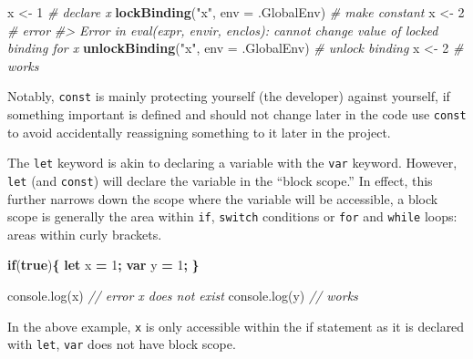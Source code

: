 \documentclass[
]{krantz}
\makeatletter
\newenvironment{Shaded}{\begin{snugshade}}{\end{snugshade}}
\newcommand{\AttributeTok}[1]{\textcolor[rgb]{0.61,0.61,0.61}{#1}}
\newcommand{\CommentTok}[1]{\textcolor[rgb]{0.37,0.37,0.37}{\textit{#1}}}
\newcommand{\ControlFlowTok}[1]{\textcolor[rgb]{0.27,0.27,0.27}{\textbf{#1}}}
\newcommand{\DataTypeTok}[1]{\textcolor[rgb]{0.27,0.27,0.27}{#1}}
\newcommand{\DecValTok}[1]{\textcolor[rgb]{0.06,0.06,0.06}{#1}}
\newcommand{\KeywordTok}[1]{\textcolor[rgb]{0.27,0.27,0.27}{\textbf{#1}}}
\newcommand{\NormalTok}[1]{#1}
\newcommand{\OperatorTok}[1]{\textcolor[rgb]{0.43,0.43,0.43}{\textbf{#1}}}
\newcommand{\StringTok}[1]{\textcolor[rgb]{0.5,0.5,0.5}{#1}}
\newcommand{\VariableTok}[1]{\textcolor[rgb]{0,0,0}{#1}}
\newenvironment{kframe}{%
\medskip{}
\setlength{\fboxsep}{.8em}
 \def\at@end@of@kframe{}%
 \ifinner\ifhmode%
  \def\at@end@of@kframe{\end{minipage}}%
  \begin{minipage}{\columnwidth}%
 \fi\fi%
 \def\FrameCommand##1{\hskip\@totalleftmargin \hskip-\fboxsep
 \colorbox{shadecolor}{##1}\hskip-\fboxsep
     \hskip-\linewidth \hskip-\@totalleftmargin \hskip\columnwidth}%
 \MakeFramed {\advance\hsize-\width
   \@totalleftmargin\z@ \linewidth\hsize
   \@setminipage}}%
 {\par\unskip\endMakeFramed%
 \at@end@of@kframe}
\renewenvironment{Shaded}{\begin{kframe}}{\end{kframe}}
\makeatother
\begin{document}
\begin{Shaded}
\begin{Highlighting}[]
\NormalTok{x <{-}}\StringTok{ }\DecValTok{1} \CommentTok{\# declare x}
\KeywordTok{lockBinding}\NormalTok{(}\StringTok{"x"}\NormalTok{, }\DataTypeTok{env =}\NormalTok{ .GlobalEnv) }\CommentTok{\# make constant}
\NormalTok{x <{-}}\StringTok{ }\DecValTok{2} \CommentTok{\# error}
\CommentTok{\#> Error in eval(expr, envir, enclos): cannot change value of locked binding for \textquotesingle{}x\textquotesingle{}}
\KeywordTok{unlockBinding}\NormalTok{(}\StringTok{"x"}\NormalTok{, }\DataTypeTok{env =}\NormalTok{ .GlobalEnv) }\CommentTok{\# unlock binding}
\NormalTok{x <{-}}\StringTok{ }\DecValTok{2} \CommentTok{\# works}
\end{Highlighting}
\end{Shaded}

Notably, \texttt{const} is mainly protecting yourself (the developer) against yourself, if something important is defined and should not change later in the code use \texttt{const} to avoid accidentally reassigning something to it later in the project.

The \texttt{let} keyword is akin to declaring a variable with the \texttt{var} keyword. However, \texttt{let} (and \texttt{const}) will declare the variable in the ``block scope.'' In effect, this further narrows down the scope where the variable will be accessible, a block scope is generally the area within \texttt{if}, \texttt{switch} conditions or \texttt{for} and \texttt{while} loops: areas within curly brackets.

\begin{Shaded}
\begin{Highlighting}[]
\ControlFlowTok{if}\NormalTok{(}\KeywordTok{true}\NormalTok{)}\OperatorTok{\{}
  \KeywordTok{let}\NormalTok{ x }\OperatorTok{=} \DecValTok{1}\OperatorTok{;}
  \KeywordTok{var}\NormalTok{ y }\OperatorTok{=} \DecValTok{1}\OperatorTok{;}
\OperatorTok{\}}

\VariableTok{console}\NormalTok{.}\AttributeTok{log}\NormalTok{(x) }\CommentTok{// error x does not exist}
\VariableTok{console}\NormalTok{.}\AttributeTok{log}\NormalTok{(y) }\CommentTok{// works}
\end{Highlighting}
\end{Shaded}

In the above example, \texttt{x} is only accessible within the if statement as it is declared with \texttt{let}, \texttt{var} does not have block scope.
\end{document}
